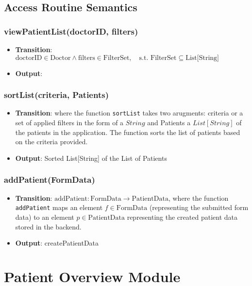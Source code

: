 \documentclass[12pt, titlepage]{article}
\begin{document}
\subsection{Access Routine Semantics}
\subsubsection{viewPatientList(doctorID, filters)}

\begin{itemize}
    \item \textbf{Transition}: $\text{doctorID} \in \text{Doctor} \land \text{filters} \in \text{FilterSet}, \quad \text{s.t. } \text{FilterSet} \subseteq \text{List[String]}$
    \item \textbf{Output}: 
\end{itemize}

\subsubsection{sortList(criteria, Patients)}

\begin{itemize}
    \item \textbf{Transition}: where the function \texttt{sortList} takes two arugments: criteria or a set of applied filters in the form of a $String$  and Patients a $List[String]$ of the patients in the application. The function sorts the list of patients based on the criteria provided.
    \item \textbf{Output}: Sorted List[String] of the List of Patients
\end{itemize}

\subsubsection{addPatient(FormData)}
\begin{itemize}
    \item \textbf{Transition}: $\text{addPatient} : \text{FormData} \to \text{PatientData}$, where the function \texttt{addPatient} maps an element $f \in \text{FormData}$ (representing the submitted form data) to an element $p \in \text{PatientData}$ representing the created patient data stored in the backend.
    \item \textbf{Output}: createPatientData
\end{itemize}


\newpage
\section{Patient Overview Module}
\end{document}
